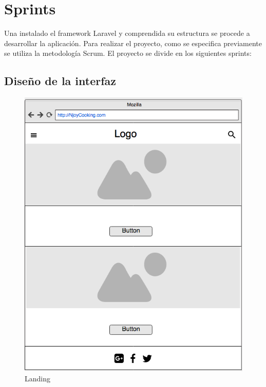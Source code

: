 \vspace{5 mm}

\section{Sprints}

Una instalado el framework Laravel y comprendida su estructura se procede a desarrollar la aplicación. Para realizar el proyecto, como se especifica previamente se utiliza la metodología Scrum. El proyecto se divide en los siguientes sprints:


\subsection{Diseño de la interfaz}

\begin{figure}
\begin{center}
\includegraphics[width=1.0\textwidth]{imagenes/landing.png}
\caption{Landing}
\label{landing}
\end{center}
\end{figure}

